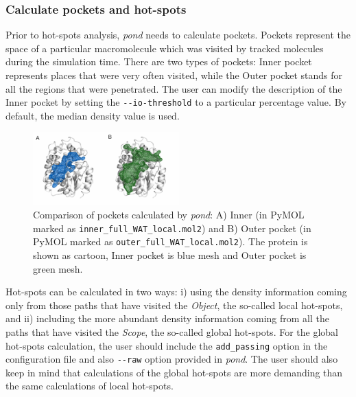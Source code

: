 \documentclass[9pt,tutorial, pubversion]{livecoms}
\begin{document}
\subsubsection{Calculate pockets and hot-spots}
Prior to hot-spots analysis, \emph{pond} needs to calculate pockets. Pockets represent the space of a particular macromolecule which was visited by tracked molecules during the simulation time. There are two types of pockets: Inner pocket represents places that were very often visited, while the Outer pocket stands for all the regions that were  penetrated. The user can modify the description of the Inner pocket by setting the \texttt{-{}-io-threshold} to a particular percentage value. By default, the median density value is used.

\begin{figure}[ht!]
\centering
\includegraphics[width=0.5\textwidth]{Tut4.2.png}
\caption{Comparison of pockets calculated by \textit{pond}: A) Inner (in PyMOL marked as \texttt{inner\_full\_WAT\_local.mol2}) and B) Outer pocket (in PyMOL marked as \texttt{outer\_full\_WAT\_local.mol2}). The protein is shown as cartoon, Inner pocket is blue mesh and Outer pocket is green mesh.}
\label{Tut4.2}
\end{figure}

Hot-spots can be calculated in two ways: i) using the density information coming only from those paths that have visited the \emph{Object}, the so-called local hot-spots, and ii) including the more abundant density information coming from all the paths that have visited the \emph{Scope}, the so-called global hot-spots. For the global hot-spots calculation, the user should include the \texttt{add\_passing} option in the configuration file and also \texttt{-{}-raw} option provided in \emph{pond}. The user should also keep in mind that calculations of the global hot-spots are more demanding than the same calculations of local hot-spots.
\end{document}
